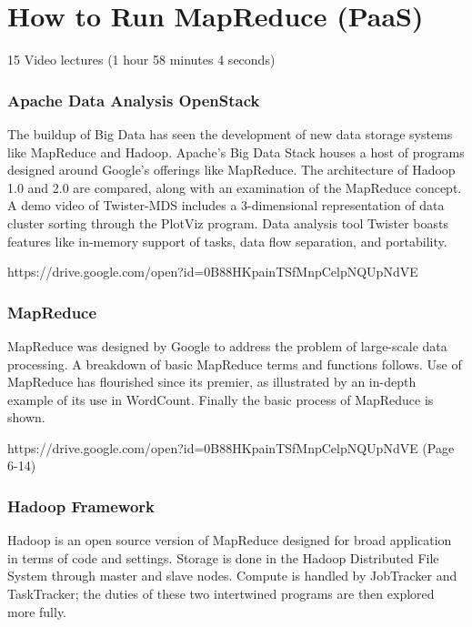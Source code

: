 \part{How to Run MapReduce (PaaS)}

  15 Video lectures (1 hour 58 minutes 4 seconds)

\section{Apache Data Analysis OpenStack}

The buildup of Big Data has seen the development of new data storage
systems like MapReduce and Hadoop. Apache's Big Data Stack houses a host
of programs designed around Google's offerings like MapReduce. The
architecture of Hadoop 1.0 and 2.0 are compared, along with an
examination of the MapReduce concept. A demo video of Twister-MDS
includes a 3-dimensional representation of data cluster sorting through
the PlotViz program. Data analysis tool Twister boasts features like
in-memory support of tasks, data flow separation, and portability.


{https://drive.google.com/open?id=0B88HKpainTSfMnpCelpNQUpNdVE}

\section{MapReduce}

MapReduce was designed by Google to address the problem of large-scale
data processing. A breakdown of basic MapReduce terms and functions
follows. Use of MapReduce has flourished since its premier, as
illustrated by an in-depth example of its use in WordCount. Finally the
basic process of MapReduce is shown.


{https://drive.google.com/open?id=0B88HKpainTSfMnpCelpNQUpNdVE
  (Page 6-14)}

\section{Hadoop Framework}

Hadoop is an open source version of MapReduce designed for broad
application in terms of code and settings. Storage is done in the Hadoop
Distributed File System through master and slave nodes. Compute is
handled by JobTracker and TaskTracker; the duties of these two
intertwined programs are then explored more fully.

